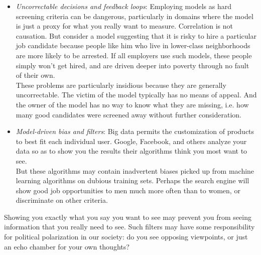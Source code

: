 \documentclass[10pt]{article}
\begin{document}
\begin{enumerate}
\begin{itemize}
  \item \textit{Uncorrectable decisions and feedback loops}: Employing models as hard screening criteria can be dangerous, particularly in domains where the model is just a proxy for what you really want to measure. Correlation is not causation. But consider a model suggesting that it is risky to hire a particular job candidate because people like him who live in lower-class neighborhoods are more likely to be arrested. If all employers use such models, these people simply won't get hired, and are driven deeper into poverty through no fault of their own.\\
These problems are particularly insidious because they are generally uncorrectable. The victim of the model typically has no means of appeal. And the owner of the model has no way to know what they are missing, i.e. how many good candidates were screened away without further consideration.

  \item \textit{Model-driven bias and filters}: Big data permits the customization of products to best fit each individual user. Google, Facebook, and others analyze your data so as to show you the results their algorithms think you most want to see.\\
But these algorithms may contain inadvertent biases picked up from machine learning algorithms on dubious training sets. Perhaps the search engine will show good job opportunities to men much more often than to women, or discriminate on other criteria.
\end{itemize}

Showing you exactly what you say you want to see may prevent you from seeing information that you really need to see. Such filters may have some responsibility for political polarization in our society: do you see opposing viewpoints, or just an echo chamber for your own thoughts?


\end{enumerate}
\end{document}
